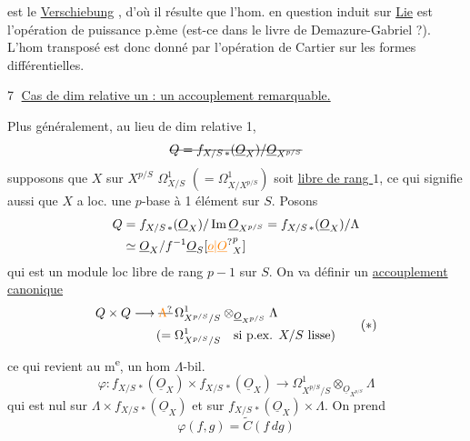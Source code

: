 est le \uline{Verschiebung} , d'où il résulte que l'hom.
en question induit sur \uline{Lie} est l'opération de puissance p.ème (est-ce dans le livre de Demazure-Gabriel ?).  L'hom transposé est donc donné par l'opération de Cartier sur les formes différentielles.

\textcircled{7} \uline{Cas  de  dim relative un : un accouplement remarquable.}

 Plus généralement, au lieu de dim relative 1,
\[
 \deleted{Q=f_{X/S\,*}(\underline O_X)/\underline O_{X^{p/S}}}
\]
supposons que $X$ sur $X^{p/S}$   $\Omega^1_{X/S}$ $(=\Omega^1_{X/X^{p/S}})$ soit \uline{libre de rang $1$}, ce qui signifie aussi que $X$ a loc. une $p$-base à 1 élément sur $S$. Posons
\[
\begin{aligned}
 Q&=f_{X/S\,*}(\underline O_X)/\operatorname{Im}\underline O_{X^{p/S}}
 =f_{X/S\,*}(\underline O_X)/\Lambda\\
 &\simeq\underline O_X/f^{-1}\underline O_S[\unsure{\underline o|\underline O}_X^p]
\end{aligned}
\]
qui est un module loc libre de rang $p-1$ sur $S$. On va définir un \uline{accouplement  canonique}
\[
 \begin{aligned}
 Q\times Q&\longrightarrow\deleted{\unsure{\Lambda}}\,\Omega^1_{X^{p/S}/S}
 \otimes_{\underline O_{X^{p/S}}}\Lambda\\
 &\qquad(=\Omega^1_{X^{p/S}/S}\quad\text{si p.ex. $X/S$ lisse})
 \end{aligned}\tag*{($\ast$)}
\]
\margin{$-$}   ce qui revient au m\textsuperscript{e}, un hom $\Lambda$-bil.
\[
 \varphi:f_{X/S\,*}(\underline O_X)\times f_{X/S\,*}(\underline O_X)
 \longrightarrow\Omega^1_{X^{p/S}/S}\otimes_{\underline O_{X^{p/S}}}\Lambda
\]
qui est nul sur $\Lambda\times f_{X/S\,*}(\underline O_X)$ et sur $f_{X/S\,*}(\underline O_X)\times\Lambda$.
On prend
\[
 \varphi(f,g)=\widetilde C(f\,dg)
\]

